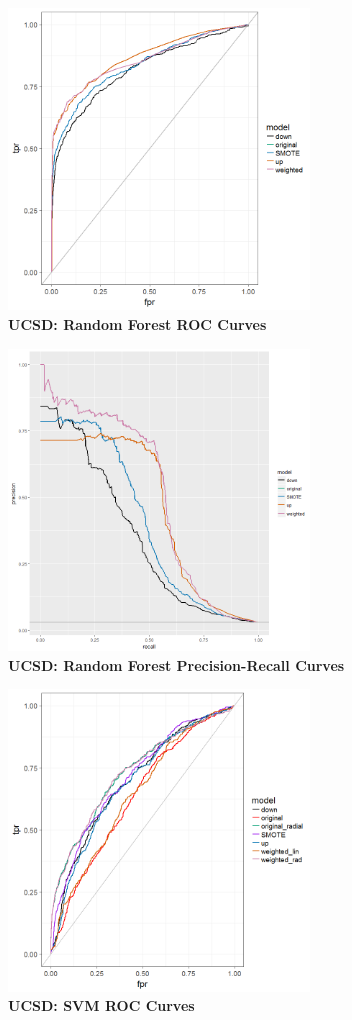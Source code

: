 \documentclass[12pt,]{article}
\begin{document}
\includegraphics[width=0.6\textwidth,height=\textheight]{figures/ucsd/ucsd_randfor_rocs.png}\\
\textbf{UCSD: Random Forest ROC Curves}

\includegraphics[width=0.6\textwidth,height=\textheight]{figures/ucsd/ucsd_randfor_PR.png}\\
\textbf{UCSD: Random Forest Precision-Recall Curves}

\includegraphics[width=0.6\textwidth,height=\textheight]{figures/ucsd/ucsd_svm_rocs.png}\\
\textbf{UCSD: SVM ROC Curves}
\end{document}
